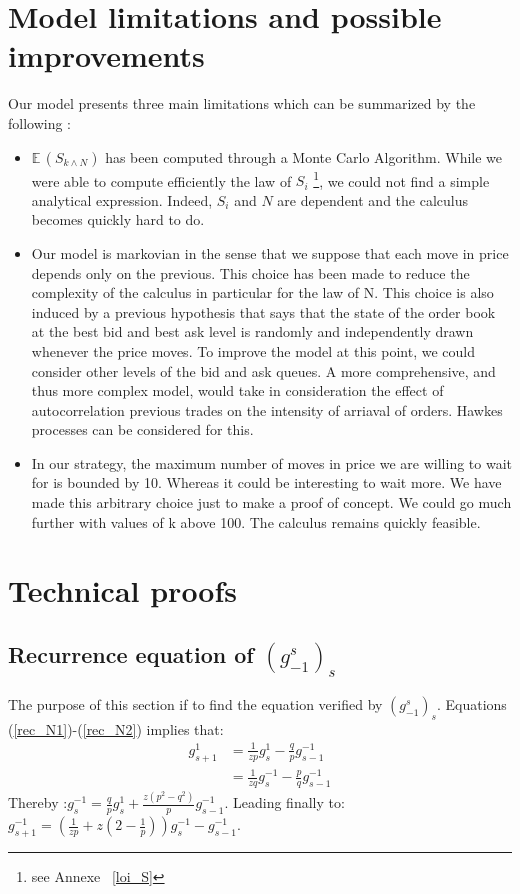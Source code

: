 \documentclass{article}
\newcommand{\g}[2]{g_{#1}^{#2}}
\newcommand{\Min}[2]{ {#1} \wedge {#2} }
\begin{document}
\section{Model limitations and possible improvements}
Our model presents three main limitations which can be summarized by the following :
\begin{itemize}
\item  $\mathbb{E} \, \left( S_{\Min k N} \right) $ has been computed through a Monte Carlo Algorithm. While we were able to compute efficiently the law of $S_i$ \footnote{see Annexe ~\ref{loi_S}}, we could not find a simple analytical expression. Indeed, $S_i$ and $N$ are dependent and the calculus becomes quickly hard to do.
\item Our model is markovian in the sense that we suppose that each move in price depends only on the previous. This choice has been made to reduce the complexity of the calculus in particular for the law of N. This choice is also induced by a previous hypothesis that says that the state of the order book at the best bid and best ask level is randomly and independently drawn whenever the price moves. To improve the model at this point, we could consider other levels of the bid and ask queues. A more comprehensive, and thus more complex model, would take in consideration the effect of autocorrelation previous trades on the intensity of arriaval of orders. Hawkes processes can be considered for this.
\item In our strategy, the maximum number of moves in price we are willing to wait for is bounded by 10. Whereas it could be interesting to wait more. We have made this arbitrary choice just to make a proof of concept. We could go much further with  values of k above 100. The calculus remains quickly feasible.
\end{itemize}

\newpage

\appendix

\section{  Technical proofs}

\subsection{ Recurrence equation of $(\g{-1}{s})_s$ }
The purpose of this section if to find the equation verified by $(\g{-1}{s})_s$.
Equations (\ref{rec_N1})-(\ref{rec_N2}) implies that:
\begin{align*}
		\g{s+1}{1} &= \frac{1}{z p} \g{s}{1} - \frac{q}{p} \g{s-1}{-1} \\
&= \frac{1}{ zq} \g{s}{-1} - \frac{p}{q} \g{s-1}{-1}
\end{align*}
Thereby :$\g{s}{-1} =\frac{q}{p} \g{s}{1}+\frac{z (p^{2}-q^{2})}{p} \g{s-1}{-1}$.
Leading finally to: $\g{s+1}{-1} =  (\frac{1}{z p}   + z(2 - \frac{1}{p})) \g{s}{-1}  -  \g{s-1}{-1} $.
\end{document}
